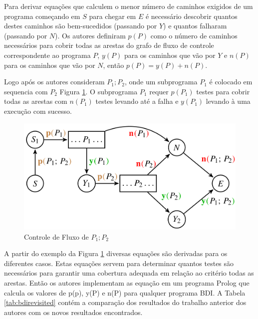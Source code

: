 \documentclass[dm,ppgcomp]{texfurg} %
\begin{document}
Para derivar equações que calculem o menor número de caminhos exigidos de um programa começando em $S$ para chegar em $E$ é necessário descobrir quantos destes caminhos são bem-sucedidos (passando por $Y$) e quantos falharam (passando por $N$). Os autores definiram $p(P)$ como o número de caminhos necessários para cobrir todas as arestas do grafo de fluxo de controle correspondente ao programa $P$, $y(P)$ para os caminhos que vão por $Y$ e $n(P)$ para os caminhos que vão por $N$, então $p(P) = y(P) + n(P)$.

Logo após os autores consideram $P_{1};P_{2}$, onde um subprograma $P_{1}$ é colocado em sequencia com $P_{2}$ Figura \ref{fig:grafop1p2}. O subprograma $P_{1}$ requer $p(P_{1})$ testes para cobrir todas as arestas com $n(P_{1})$ testes levando até a falha e $y(P_{1})$ levando à uma execução com sucesso.

\begin{figure}[ht]
\centering
\includegraphics[scale=0.3]{imagens/grafop1p2.png}
\caption{Controle de Fluxo de $P_{1};P_{2}$}
\label{fig:grafop1p2}
\end{figure}

A partir do exemplo da Figura \ref{fig:grafop1p2} diversas equações são derivadas para os diferentes casos. Estas equações servem para determinar quantos testes são necessários para garantir uma cobertura adequada em relação ao critério todas as arestas. Então os autores implementam as equação em um programa Prolog que calcula os valores de p(p), y(P) e n(P) para qualquer programa BDI. A Tabela \ref{tab:bdirevisited} contém a comparação dos resultados do trabalho anterior dos autores \cite{winikoff2014testability} com os novos resultados encontrados.
\end{document}

